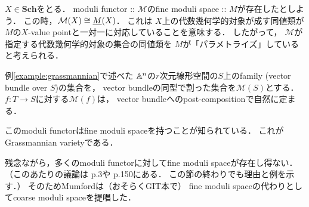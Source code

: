 \documentclass[a4paper]{jsarticle}
\newcommand{\Sch}{\mathbf{Sch}}
\newcommand{\func}[1]{\underline{#1}}
\newcommand{\ftorM}{\mathcal{M}}
\begin{document}





    \begin{Remark}
        $X \in \Sch$をとる．
        moduli functor :: $\ftorM$のfine moduli space :: $M$が存在したとしよう．
        この時，$\ftorM(X) \iso \func{M}(X)$．
        これは
        $X$上の代数幾何学的対象が成す同値類が
        $M$の$X$-value pointと一対一に対応していることを意味する．
        したがって，
        $\ftorM$が指定する代数幾何学的対象の集合の同値類を
        $M$が「パラメトライズ」していると考えられる．
    \end{Remark}

    \begin{Example}
        例\ref{example:grassmannian}で述べた
        $\mathbb{A}^n$の$r$次元線形空間の$S$上のfamily
        (vector bundle over $S$)の集合を，
        vector bundleの同型で割った集合を$\ftorM(S)$とする．
        $f: T \to S$に対する$\ftorM(f)$は，
        vector bundleへのpost-compositionで自然に定まる．

        このmoduli functorはfine moduli spaceを持つことが知られている．
        これがGrassmannian varietyである．
    \end{Example}

    残念ながら，多くのmoduli functorに対してfine moduli spaceが存在し得ない．
    （このあたりの議論は\cite{HaMo} p.3や\cite{HarDef} p.150にある．
    この節の終わりでも理由と例を示す．）
    そのためMumfordは（おそらくGIT本で）
    fine moduli spaceの代わりとしてcoarse moduli spaceを提唱した．
\end{document}
